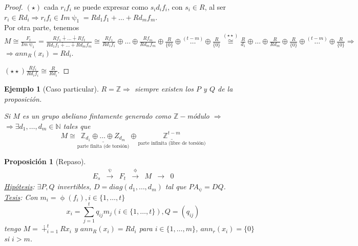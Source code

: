 \documentclass[11pt,a4paper]{article}
\theoremstyle{break}
\newtheorem{example}[theorem]{Ejemplo}
\newtheorem{proposition}[theorem]{Proposición}
\begin{document}
\begin{proof}
$(\star)$ cada $r_{i}f_{i}$ se puede expresar como $s_{i}d_{i}f_{i}$, con $s_{i} \in R$, al ser $r_{i} \in Rd_{i} \Rightarrow r_{i}f_{i} \in Im \uppsi_{1} = Rd_{1}f_{1} + \dots + Rd_{m}f_{m}$. \\
Por otra parte, tenemos $M \cong \frac{F_{t}}{Im \uppsi_{1}} = \frac{Rf_{1} \dotplus \dots \dotplus Rf_{t}}{Rd_{1}f_{1} \dotplus \dots \dotplus Rd_{m}f_{m}} \cong \frac{Rf_{1}}{Rd_{1}f_{1}} \oplus \dots \oplus \frac{Rf_{m}}{Rd_{m}f_{m}} \oplus \frac{R}{\{0\}} \oplus \overset{(t-m)}{\dots} \oplus \frac{R}{\{0\}} \overset{(\star \star)}{\cong} \frac{R}{d_{1}} \oplus \dots \oplus \frac{R}{Rd_{m}} \oplus \frac{R}{\{0\}} \oplus \overset{(t-m)}{\dots} \oplus \frac{R}{\{0\}} \Rightarrow$ \\ $\Rightarrow ann_{R}(x_{i}) = Rd_{i}$.

$(\star\star) \frac{Rf_{i}}{Rd_{i}f_{i}} \cong \frac{R}{Rd_{i}}$.
\end{proof}

\begin{example}[Caso particular]
$R = \mathbb{Z} \Rightarrow$ siempre existen los $P$ y $Q$ de la proposición.

Si $M$ es un grupo abeliano fintamente generado como $\mathbb{Z}-$módulo $\Rightarrow$ \\ $\Rightarrow \exists d_{1}, \dots, d_{m} \in \mathbb{N}$ tales que
$$M \cong \underset{\text{parte finita (de torsión)}}{\underline{\mathbb{Z}_{d_{1}} \oplus \dots \oplus Z_{d_{m}}}} \oplus \underset{\text{parte infinita (libre de torsión)}}{\underline{\mathbb{Z}^{t-m}}}$$
\end{example}



\begin{proposition}[Repaso]
$$\begin{aligned}
E_{s} & \overset{\uppsi}{\to} & F_{t} & \overset{\upphi}{\to} & M & \to & 0
\end{aligned}$$
\underline{Hipótesis}: $\exists P, Q$ invertibles, $D = diag(d_{1}, \dots, d_{m})$ tal que $PA_{\uppsi} = DQ$. \\
\underline{Tesis}: Con $m_{i} = \upphi(f_{i}), i \in \{1, \dots, t\}$
$$x_{i} = \sum_{j=1}^{t} q_{ij}m_{j} (i \in \{1, \dots, t\}), Q = (q_{ij})$$
tengo $M = \dotplus_{i=1}^{t} Rx_{i}$ y $ann_{R}(x_{i}) = Rd_{i}$ para $i \in \{1, \dots, m\}$, $ann_{r}(x_{i}) = \{0\}$ si $i > m$.
\end{proposition}
\end{document}
